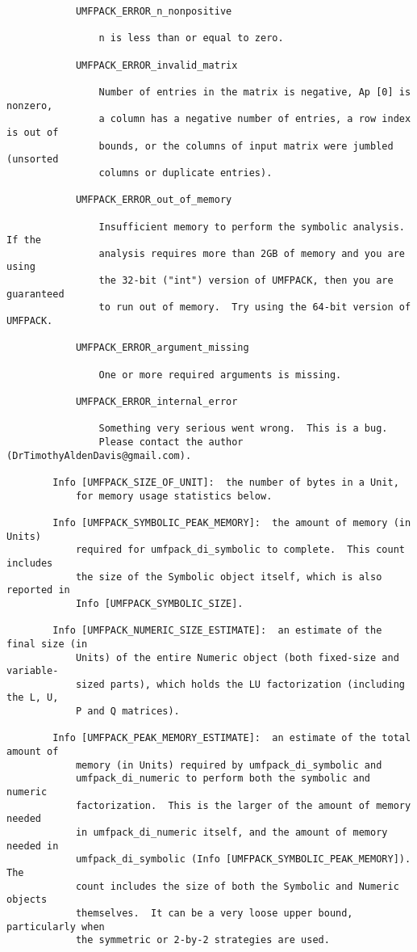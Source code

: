 \documentclass[11pt]{article}
\begin{document}
{\begin{verbatim}
            UMFPACK_ERROR_n_nonpositive

                n is less than or equal to zero.

            UMFPACK_ERROR_invalid_matrix

                Number of entries in the matrix is negative, Ap [0] is nonzero,
                a column has a negative number of entries, a row index is out of
                bounds, or the columns of input matrix were jumbled (unsorted
                columns or duplicate entries).

            UMFPACK_ERROR_out_of_memory

                Insufficient memory to perform the symbolic analysis.  If the
                analysis requires more than 2GB of memory and you are using
                the 32-bit ("int") version of UMFPACK, then you are guaranteed
                to run out of memory.  Try using the 64-bit version of UMFPACK.

            UMFPACK_ERROR_argument_missing

                One or more required arguments is missing.

            UMFPACK_ERROR_internal_error

                Something very serious went wrong.  This is a bug.
                Please contact the author (DrTimothyAldenDavis@gmail.com).

        Info [UMFPACK_SIZE_OF_UNIT]:  the number of bytes in a Unit,
            for memory usage statistics below.

        Info [UMFPACK_SYMBOLIC_PEAK_MEMORY]:  the amount of memory (in Units)
            required for umfpack_di_symbolic to complete.  This count includes
            the size of the Symbolic object itself, which is also reported in
            Info [UMFPACK_SYMBOLIC_SIZE].

        Info [UMFPACK_NUMERIC_SIZE_ESTIMATE]:  an estimate of the final size (in
            Units) of the entire Numeric object (both fixed-size and variable-
            sized parts), which holds the LU factorization (including the L, U,
            P and Q matrices).

        Info [UMFPACK_PEAK_MEMORY_ESTIMATE]:  an estimate of the total amount of
            memory (in Units) required by umfpack_di_symbolic and
            umfpack_di_numeric to perform both the symbolic and numeric
            factorization.  This is the larger of the amount of memory needed
            in umfpack_di_numeric itself, and the amount of memory needed in
            umfpack_di_symbolic (Info [UMFPACK_SYMBOLIC_PEAK_MEMORY]).  The
            count includes the size of both the Symbolic and Numeric objects
            themselves.  It can be a very loose upper bound, particularly when
            the symmetric or 2-by-2 strategies are used.


\end{verbatim}}
\end{document}
